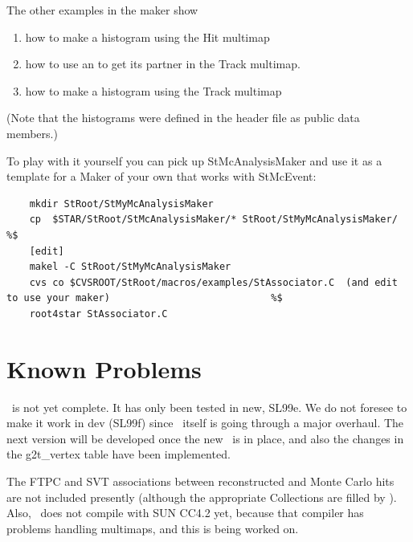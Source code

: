 The other examples in the maker show
\begin{enumerate}
\item how to make a histogram using the Hit multimap
\item how to use an  to get its partner in the Track multimap.
\item how to make a histogram using the Track multimap
\end{enumerate}

(Note that the histograms were defined in the header file as public data members.)

To play with it yourself you can pick up StMcAnalysisMaker and 
use it as a template for a Maker of your own that works with
StMcEvent:

\begin{verbatim}
    mkdir StRoot/StMyMcAnalysisMaker
    cp  $STAR/StRoot/StMcAnalysisMaker/* StRoot/StMyMcAnalysisMaker/                                   %$
    [edit]
    makel -C StRoot/StMyMcAnalysisMaker
    cvs co $CVSROOT/StRoot/macros/examples/StAssociator.C  (and edit to use your maker)                            %$
    root4star StAssociator.C
\end{verbatim}



\section{Known Problems} 

\StAssociationMaker\ is not yet complete.  
It has only been tested in new, SL99e.  We do not foresee
to make it work in dev (SL99f) since \StEvent\ itself is going through a major
overhaul.  The next version will be developed once the new \StEvent\
is in place, and also the changes in the g2t\_vertex table have been
implemented.

The FTPC and SVT associations between reconstructed and Monte Carlo
hits are not included presently (although the appropriate Collections are
filled by \name{StMcEventMaker} ). 
Also, \StAssociationMaker\ does not compile with SUN CC4.2 yet, because
that compiler has problems handling multimaps, and this is being worked on.


\clearpage

%
%
